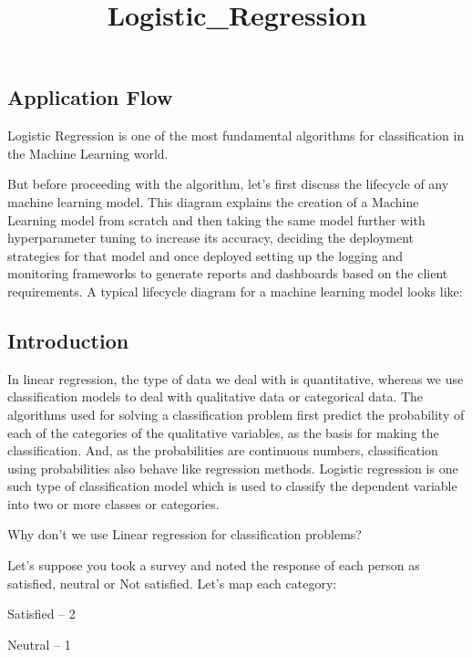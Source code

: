 \documentclass[11pt]{article}
\title{Logistic\_Regression}
\begin{document}
    
    
    \maketitle
    
    

    
    \subsection{Application Flow}\label{application-flow}

Logistic Regression is one of the most fundamental algorithms for
classification in the Machine Learning world.

But before proceeding with the algorithm, let's first discuss the
lifecycle of any machine learning model. This diagram explains the
creation of a Machine Learning model from scratch and then taking the
same model further with hyperparameter tuning to increase its accuracy,
deciding the deployment strategies for that model and once deployed
setting up the logging and monitoring frameworks to generate reports and
dashboards based on the client requirements. A typical lifecycle diagram
for a machine learning model looks like:

    \subsection{Introduction}\label{introduction}

In linear regression, the type of data we deal with is quantitative,
whereas we use classification models to deal with qualitative data or
categorical data. The algorithms used for solving a classification
problem first predict the probability of each of the categories of the
qualitative variables, as the basis for making the classification. And,
as the probabilities are continuous numbers, classification using
probabilities also behave like regression methods. Logistic regression
is one such type of classification model which is used to classify the
dependent variable into two or more classes or categories.

Why don't we use Linear regression for classification problems?

Let's suppose you took a survey and noted the response of each person as
satisfied, neutral or Not satisfied. Let's map each category:

Satisfied -- 2

Neutral -- 1
\end{document}
